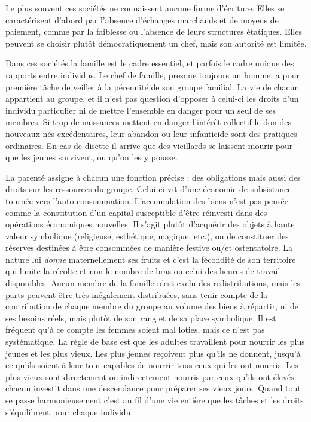 Le plus souvent ces sociétés ne connaissent aucune forme d'écriture. Elles se caractérisent d'abord par l'absence d'échanges marchands et de moyens de paiement, comme par la faiblesse ou l'absence de leurs structures étatiques. Elles peuvent se choisir plutôt démocratiquement un chef, mais son autorité est limitée. 

Dans ces sociétés la famille est le cadre essentiel, et parfois le cadre unique des rapports entre individus. Le chef de famille, presque toujours un homme, a pour première tâche de veiller à la pérennité de son groupe familial. La vie de chacun appartient au groupe, et il n'est pas question d'opposer à celui-ci les droits d'un individu particulier ni de mettre l'ensemble en danger pour un seul de ses membres. Si trop de naissances mettent en danger l'intérêt collectif le don des nouveaux nés excédentaires, leur abandon ou leur infanticide sont des pratiques ordinaires. En cas de disette il arrive que des vieillards se laissent mourir pour que les jeunes survivent, ou qu'on les y pousse.

La parenté assigne à chacun une fonction précise : des obligations mais aussi des droits sur les ressources du groupe. Celui-ci vit d'une économie de subsistance tournée vers l'auto-consommation. L'accumulation des biens n'est pas pensée comme la constitution d'un capital susceptible d'être réinvesti dans des opérations économiques nouvelles. Il s'agit plutôt d'acquérir des objets à haute valeur symbolique (religieuse, esthétique, magique, etc.), ou de constituer des réserves destinées à être consommées de manière festive ou/et ostentatoire. La nature lui \emph{donne} maternellement ses fruits et c'est la fécondité de son territoire qui limite la récolte et non le nombre de bras ou celui des heures de travail disponibles. Aucun membre de la famille n'est exclu des redistributions, mais les parts peuvent être très inégalement distribuées, sans tenir compte de la contribution de chaque membre du groupe au volume des biens à répartir, ni de ses besoins réels, mais plutôt de son rang et de sa place symbolique. Il est fréquent qu’à ce compte les femmes soient mal loties, mais ce n’est pas systématique. La règle de base est que les adultes travaillent pour nourrir les plus jeunes et les plus vieux. Les plus jeunes reçoivent plus qu'ils ne donnent, jusqu'à ce qu'ils soient à leur tour capables de nourrir tous ceux qui les ont nourris. Les plus vieux sont directement ou indirectement nourris par ceux qu'ils ont élevés : chacun investit dans une descendance pour préparer ses vieux jours. Quand tout se passe harmonieusement c'est au fil d'une vie entière que les tâches et les droits s'équilibrent pour chaque individu. 

